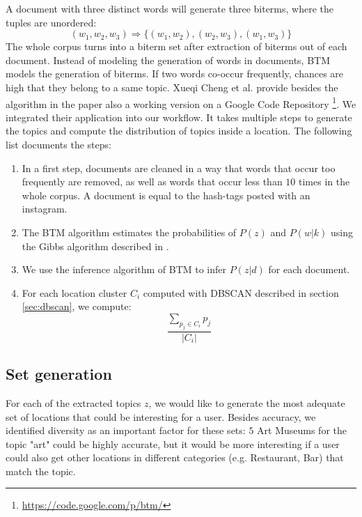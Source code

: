 A document with three distinct words will generate three biterms, where the tuples are unordered: 
\[
  (w_1, w_2, w_3) \Rightarrow \{(w_1, w_2), (w_2, w_3), (w_1, w_3)\}
\]
The whole corpus turns into a biterm set after extraction of biterms out of each document. Instead of modeling the generation of words in documents, BTM models the generation of biterms. If two words co-occur frequently, chances are high that they belong to a same topic. Xueqi Cheng et al. provide besides the algorithm in the paper also a working version on a Google Code Repository \footnote{\url{https://code.google.com/p/btm/}}. We integrated their application into our workflow. It takes multiple steps to generate the topics and compute the distribution of topics inside a location. The following list documents the steps:
\begin{enumerate}
  \item In a first step, documents are cleaned in a way that words that occur too frequently are removed, as well as words that occur less than $10$ times in the whole corpus. A document is equal to the hash-tags posted with an instagram.
  \item The BTM algorithm estimates the probabilities of $P(z)$ and $P(w|k)$ using the Gibbs algorithm described in \cite{btm}.
  \item We use the inference algorithm of BTM to infer $P(z|d)$ for each document.
  \item For each location cluster $C_i$ computed with DBSCAN described in section \ref{sec:dbscan}, we compute: \[
  \frac{\sum_{p_j \in C_i} p_j}{|C_i|}
  \]
\end{enumerate}

\subsection{Set generation}

For each of the extracted topics $z$, we would like to generate the most adequate set of locations that could be interesting for a user. Besides accuracy, we identified diversity as an important factor for these sets: $5$ Art Museums for the topic "art" could be highly accurate, but it would be more interesting if a user could also get other locations in different categories (e.g. Restaurant, Bar) that match the topic.

